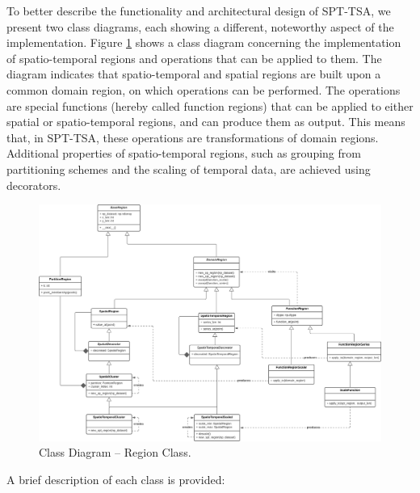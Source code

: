 To better describe the functionality and architectural design of SPT-TSA, we present two class diagrams, each showing a different, noteworthy aspect of the implementation. Figure \ref{Fig:DiagramClasess-Region} shows a class diagram concerning the implementation of spatio-temporal regions and operations that can be applied to them. The diagram indicates that spatio-temporal and spatial regions are built upon a common domain region, on which operations can be performed. The operations are special functions (hereby called function regions) that can be applied to either spatial or spatio-temporal regions, and can produce them as output. This means that, in SPT-TSA, these operations are transformations of domain regions. Additional properties of spatio-temporal regions, such as grouping from partitioning schemes and the scaling of temporal data, are achieved using decorators.

\begin{figure}[tp]
	\centering
	\includegraphics[scale=0.41, angle=90]{../Figures/SPT-TSA-RegionClasses}
	\caption{Class Diagram -- Region Class.}	
	\label{Fig:DiagramClasess-Region}	 		
\end{figure}

A brief description of each class is provided:

